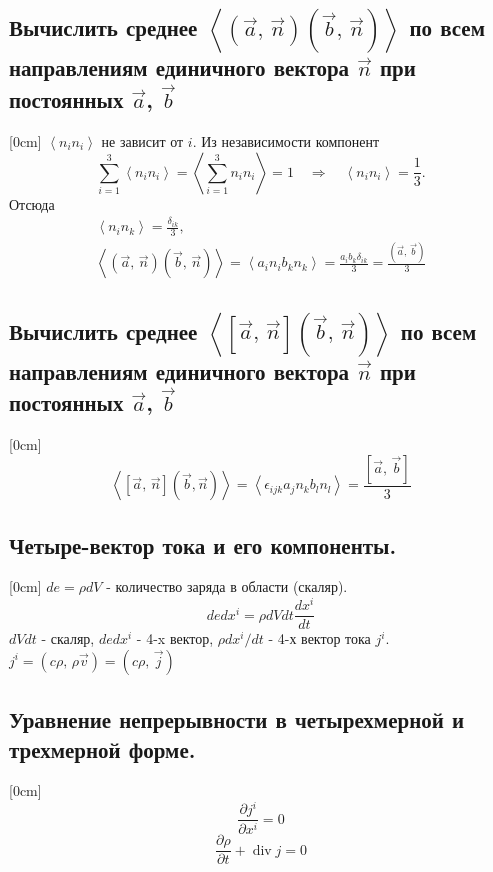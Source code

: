 \documentclass[a4paper,12pt]{article}
\begin{document}
\subsection{Вычислить среднее $\left<\left(\vec{a},\,\vec{n}\right)
\left( \vec{b},\,\vec{n} \right) \right>$ по всем направлениям единичного
вектора $\vec{n}$ при постоянных  $\vec{a}$, $\vec{b}$}
[0cm]
$\left< n_i n_i\right>$ не зависит от $i$. Из независимости компонент 
\[
\sum_{i=1}^3\left< n_i n_i\right>=\left<\sum_{i=1}^3 n_i n_i\right>=1
\quad \Rightarrow \quad \left< n_i n_i\right>=\frac{1}{3}.
\]
Отсюда 
\begin{gather*}
	\left< n_i n_k\right>=\frac{\delta_{ik}}{3},\\
	\left<\left(\vec{a},\,\vec{n}\right)
\left(\vec{b}
,\,\vec{n}\right)\right>=\left< a_i n_i b_k n_k\right>=\frac{a_i b_k \delta_{ik}}{3}=
\frac{\left(\vec{a},\,\vec{b}\right)}{3}
\end{gather*}
\subsection{Вычислить среднее $\left<\left[\vec{a},\,\vec{n}\right]
\left( \vec{b},\,\vec{n} \right) \right>$ по всем направлениям единичного
вектора $\vec{n}$ при постоянных  $\vec{a}$, $\vec{b}$}
[0cm]
\[
	\left<[\vec{a},\,\vec{n}]\left(\vec{b},\vec{n}\right)\right>=\left<
	\epsilon_{ijk}
	a_j n_k b_l n_l\right>=\frac{\left[\vec{a},\,\vec{b}\right]}{3}
\]
\subsection{Четыре-вектор тока и его компоненты.}
[0cm]
$de=\rho dV$ - количество заряда в области (скаляр).
\[
de dx^i=\rho dV dt \frac{dx^i}{dt}
\]
$dV dt$ - скаляр, $de dx^i$ - 4-x вектор, $\rho dx^i/dt$ - 4-х вектор тока $j^i$.
$j^i=\left(c\rho,\,\rho\vec{v}\right)=\left(c\rho,\,\vec{j}\right)$
\subsection{Уравнение непрерывности в четырехмерной и трехмерной форме.}
[0cm]
\[\frac{\partial j^i}{\partial x^i}=0\]
\[\frac{\partial \rho}{\partial t}+\operatorname{div} j=0 \]
\end{document}

